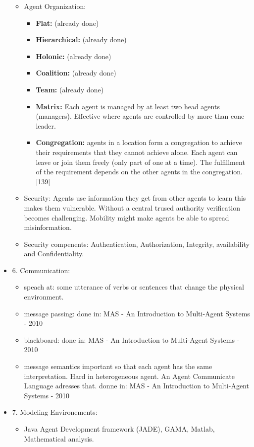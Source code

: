 \begin{itemize}[noitemsep,nolistsep]
\begin{itemize}[noitemsep,nolistsep]
		\item Agent Organization:
		\begin{itemize}[noitemsep,nolistsep]
			\item \textbf{Flat:} (already done)
			\item \textbf{Hierarchical:} (already done)
			\item \textbf{Holonic:} (already done)
			\item \textbf{Coalition:} (already done)
			\item \textbf{Team:} (already done)
			\item \textbf{Matrix:} Each agent is managed by at least two head agents (managers). Effective where agents are controlled by more than eone leader.
			\item \textbf{Congregation:} agents in a location form a congregation to achieve their requirements that they cannot achieve alone. Each agent can leave or join them freely (only part of one at a time). The fulfillment of the requirement depends on the other agents in the congregation. [139]
		\end{itemize}
		\item Security: Agents use information they get from other agents to learn this makes them vulnerable. Without a central trused authority verification becomes challenging. Mobility might make agents be able to spread misinformation.
		\item Security compenents: Authentication, Authorization, Integrity, availability and Confidentiality.
	\end{itemize}
	\item 6. Communication:
	\begin{itemize}[noitemsep,nolistsep]
		\item speach at: some utterance of verbs or sentences that change the physical environment.
		\item message passing: done in: MAS - An Introduction to Multi-Agent Systems - 2010
		\item blackboard: done in: MAS - An Introduction to Multi-Agent Systems - 2010
		\item message semantics important so that each agent has the same interpretation. Hard in heterogeneous agent. An Agent Communicate Language adresses that. donne in: MAS - An Introduction to Multi-Agent Systems - 2010
	\end{itemize}
	\item 7. Modeling Environements:
	\begin{itemize}[noitemsep,nolistsep]
		\item Java Agent Development framework (JADE), GAMA, Matlab, Mathematical analysis.
	\end{itemize}
\end{itemize}

